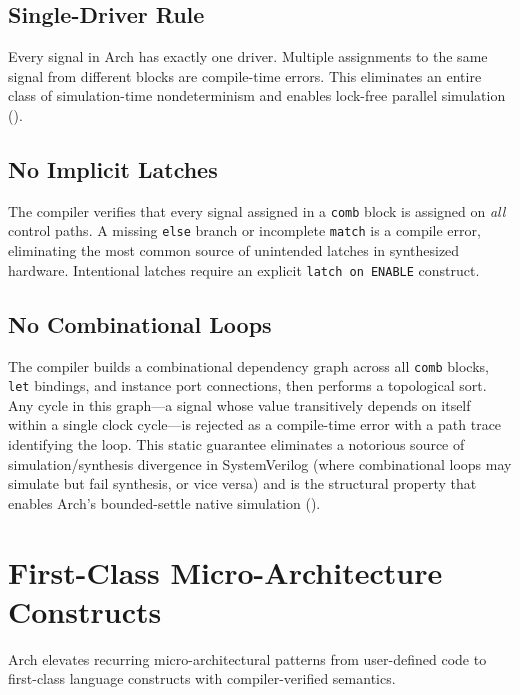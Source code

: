 \documentclass[11pt,twocolumn]{article}
\begin{document}
\subsection{Single-Driver Rule}

Every signal in Arch has exactly one driver. Multiple assignments to the same signal from different blocks are compile-time errors. This eliminates an entire class of simulation-time nondeterminism and enables lock-free parallel simulation ().

\subsection{No Implicit Latches}

The compiler verifies that every signal assigned in a \texttt{comb} block is assigned on \emph{all} control paths. A missing \texttt{else} branch or incomplete \texttt{match} is a compile error, eliminating the most common source of unintended latches in synthesized hardware. Intentional latches require an explicit \texttt{latch on ENABLE} construct.

\subsection{No Combinational Loops}

The compiler builds a combinational dependency graph across all \texttt{comb} blocks, \texttt{let} bindings, and instance port connections, then performs a topological sort. Any cycle in this graph---a signal whose value transitively depends on itself within a single clock cycle---is rejected as a compile-time error with a path trace identifying the loop. This static guarantee eliminates a notorious source of simulation/synthesis divergence in SystemVerilog (where combinational loops may simulate but fail synthesis, or vice versa) and is the structural property that enables Arch's bounded-settle native simulation ().

\section{First-Class Micro-Architecture Constructs}\label{sec:constructs}

Arch elevates recurring micro-architectural patterns from user-defined code to first-class language constructs with compiler-verified semantics.
\end{document}
